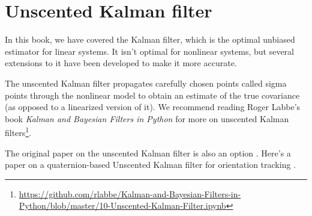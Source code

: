 \section{Unscented Kalman filter}

In this book, we have covered the Kalman filter, which is the optimal unbiased
estimator for linear \glspl{system}. It isn't optimal for nonlinear
\glspl{system}, but several extensions to it have been developed to make it more
accurate.

The unscented Kalman filter propagates carefully chosen points called sigma
points through the nonlinear model to obtain an estimate of the true covariance
(as opposed to a linearized version of it). We recommend reading Roger Labbe's
book \textit{Kalman and Bayesian Filters in Python} for more on unscented Kalman
filters\footnote{\url{https://github.com/rlabbe/Kalman-and-Bayesian-Filters-in-Python/blob/master/10-Unscented-Kalman-Filter.ipynb}}.

The original paper on the unscented Kalman filter is also an option
\cite{bib:unscented_kalman_filter}. Here's a paper on a quaternion-based
Unscented Kalman filter for orientation tracking \cite{bib:ukf_state_tracking}.
